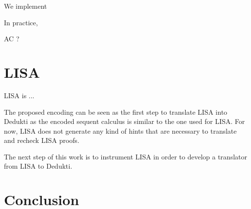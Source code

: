 \documentclass{article}
\begin{document}
	We implement 
	
	In practice, 
	
	AC ?
	
	\section{LISA}
	
	LISA is ...
	
	The proposed encoding can be seen as the first step to translate LISA into Dedukti as the encoded sequent calculus is similar to the one used for LISA.
	For now, LISA does not generate any kind of hints that are necessary to translate and recheck LISA proofs.
	
	The next step of this work is to instrument LISA in order to develop a translator from LISA to Dedukti.
	
	
	
	\section{Conclusion}
	
\end{document}
